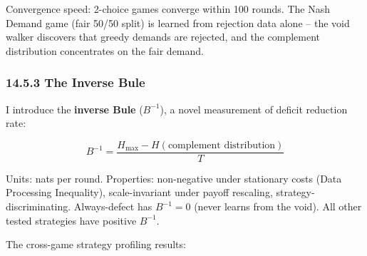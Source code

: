 \documentclass[
  11pt,
]{article}
\begin{document}
Convergence speed: 2-choice games converge within 100 rounds. The Nash
Demand game (fair 50/50 split) is learned from rejection data alone --
the void walker discovers that greedy demands are rejected, and the
complement distribution concentrates on the fair demand.

\subsubsection{14.5.3 The Inverse Bule}\label{the-inverse-bule}

I introduce the \textbf{inverse Bule} (\(B^{-1}\)), a novel measurement
of deficit reduction rate:

\[B^{-1} = \frac{H_{\max} - H(\text{complement distribution})}{T}\]

Units: nats per round. Properties: non-negative under stationary costs
(Data Processing Inequality), scale-invariant under payoff rescaling,
strategy-discriminating. Always-defect has \(B^{-1} = 0\) (never learns
from the void). All other tested strategies have positive \(B^{-1}\).

The cross-game strategy profiling results:
\end{document}
